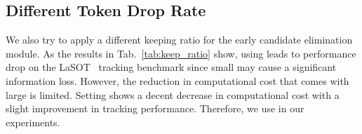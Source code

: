\subsection{Different Token Drop Rate}
We also try to apply a different keeping ratio  for the early candidate elimination module. As the results in Tab.~\ref{tab:keep_ratio} show, using  leads to performance drop on the LaSOT~\cite{lasot} tracking benchmark since small  may cause a significant information loss. However, the reduction in computational cost that comes with large  is limited. Setting  shows a decent decrease in computational cost with a slight improvement in tracking performance. Therefore, we use  in our experiments.

\begin{table}[t]
\caption{Different keeping ratio  used in the early candidate elimination module ( means the early candidate elimination module is not adopted).}
\centering
\label{tab:keep_ratio}
\end{table}

